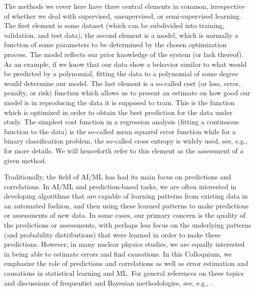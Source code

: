 \documentclass[aps,rmp,reprint,amsmath,amssymb,graphicx,longbibliography]{revtex4-1}
\begin{document}
The methods we cover here have three central elements in common,
irrespective of whether we deal with supervised, unsupervised, or
semi-supervised learning. The first element is some dataset (which can
be subdivided into training, validation, and test data), the second
element is a model, which is normally a function of some parameters to
be determined by the chosen optimization process. The model reflects
our prior knowledge of the system (or lack thereof). As an example, if
we know that our data show a behavior similar to what would be
predicted by a polynomial, fitting the data to a polynomial of some
degree would determine our model.  The last element is a so-called
cost (or loss, error, penalty, or risk) function which allows us to
present an estimate on how good our model is in reproducing the data
it is supposed to train. This is the function which is optimized in
order to obtain the best prediction for the data under study. The
simplest cost function in a regression analysis (fitting a continuous
function to the data) is the so-called mean squared error function
while for a binary classification problem, the so-called cross entropy
is widely used, see, e.g., \cite{Murphy2012,Bishop2006,Hastie2009} for
more details. We will henceforth refer to this element as the
assessment of a given method.



Traditionally, the field of AI/ML has had its main focus on
predictions and correlations.  In AI/ML and prediction-based tasks, we
are often interested in developing algorithms that are capable of
learning patterns from existing data in an automated fashion, and then
using these learned patterns to make predictions or assessments of new
data. In some cases, our primary concern is the quality of the
predictions or assessments, with perhaps less focus on the underlying
patterns (and probability distributions) that were learned in order to
make these predictions.  However, in many nuclear physics studies, we
are equally interested in being able to estimate errors and find
causations.  In this Colloquium, we emphasize the role of predictions
and correlations as well as error estimation and causations in
statistical learning and ML.  For general references on these topics
and discussions of frequentist and Bayesian methodologies, see, e.g.,
\cite{Bishop2006, Goodfellow2016, Murphy2012, Hastie2009}.

\newpage


\hfill\break


\end{document}
